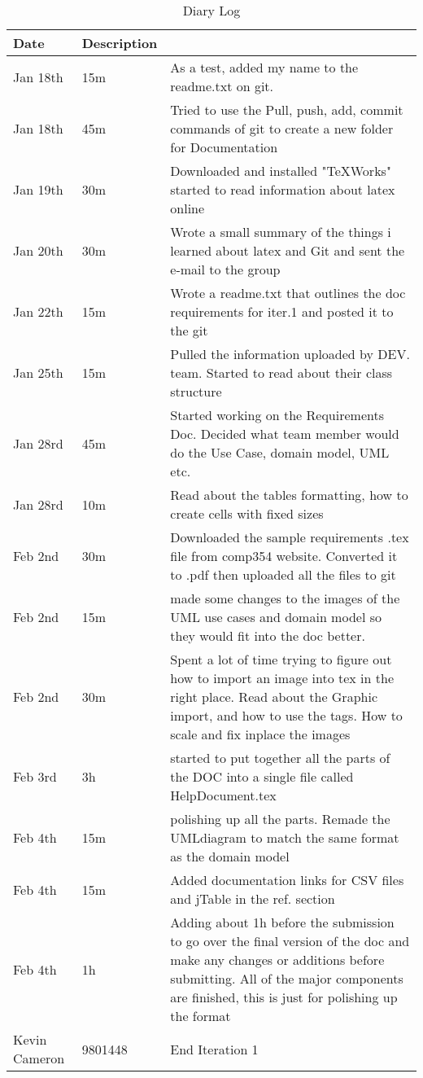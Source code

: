 \documentclass[12pt]{article}
\begin{document}
\begin{table}[htbp]
\caption{Diary Log}
\begin{tabular}{|l|l | p{12cm}|}
\hline
Date & Description \\\hline\hline
Jan 18th & 15m & As a test, added my name to the readme.txt on git. \\\hline\hline
Jan 18th& 45m & Tried to use the Pull, push, add, commit commands of git to create a new folder for Documentation \\\hline\hline
Jan 19th& 30m & Downloaded and installed "TeXWorks" started to read information about latex online \\\hline\hline
Jan 20th& 30m & Wrote a small summary of the things i learned about latex and Git and sent the e-mail to the group \\\hline\hline
Jan 22th& 15m & Wrote a readme.txt that outlines the doc requirements for iter.1 and posted it to the git \\\hline\hline
Jan 25th& 15m & Pulled the information uploaded by DEV. team. Started to read about their class structure \\\hline\hline
Jan 28rd & 45m & Started working on the Requirements Doc. Decided what team member would do the Use Case, domain model, UML etc. \\\hline\hline
Jan 28rd & 10m & Read about the tables formatting, how to create cells with fixed sizes \\\hline\hline
Feb 2nd& 30m & Downloaded the sample requirements .tex file from comp354 website. Converted it to .pdf then uploaded all the files to git \\\hline\hline
Feb 2nd& 15m & made some changes to the images of the UML use cases and domain model so they would fit into the doc better. \\\hline\hline
Feb 2nd& 30m & Spent a lot of time trying to figure out how to import an image into tex in the right place. Read about the Graphic import, and how to use the tags. How to scale and fix inplace the images \\\hline\hline
Feb 3rd& 3h & started to put together all the parts of the DOC into a single file called HelpDocument.tex \\\hline\hline
Feb 4th& 15m & polishing up all the parts. Remade the UMLdiagram to match the same format as the domain model \\\hline\hline
Feb 4th& 15m & Added documentation links for CSV files and jTable in the ref. section \\\hline\hline
Feb 4th& 1h & Adding about 1h before the submission to go over the final version of the doc and make any changes or additions before submitting. All of the major components are finished, this is just for polishing up the format \\\hline\hline
Kevin Cameron & 9801448 & End Iteration 1 \\\hline
\end{tabular}
\end{table}
\end{document}
